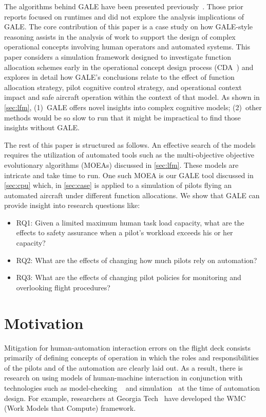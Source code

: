 \documentclass[journal]{IEEEtran}
\newcommand{\tion}[1]{\textsection\ref{sec:#1}}
\begin{document}
The algorithms behind GALE have been presented previously~\cite{krall14aaai,krallphd,galepaper}.
 Those prior reports  focused on runtimes and did not explore the analysis implications of GALE.
The core contribution of this paper is a case study on how GALE-style reasoning assists 
in the analysis of
work to support the design of complex operational concepts involving human operators and automated systems. This paper considers a simulation framework designed to investigate function allocation schemes early in the operational concept design process (CDA~\cite{Kim2011,Pritchett2011,Feigh2012,Kim2013,Pritchett2013}) 
and explores in detail how GALE’s conclusions relate to the effect of function allocation strategy, pilot cognitive control strategy, and operational context impact and safe aircraft operation within the context of that model. 
As shown in \tion{lfm}, (1)~GALE offers  novel insights into complex cognitive models; (2)~other methods would be so slow to run that it might be impractical to find those insights without GALE.


The rest of this  paper is structured as follows.
An effective search of the models requires the utilization of automated tools such as the multi-objective objective evolutionary algorithms (MOEAs) discussed in \tion{lfm}.
These models are intricate and take time to run. 
One such MOEA is our GALE tool discussed in \tion{cpu} which, in \tion{case} is applied to a simulation
of pilots flying an automated aircraft under different function allocations.
We show that GALE can provide insight into research questions like:
\begin{itemize}
\item RQ1:  Given a limited maximum human task load capacity, what are the effects to safety assurance when a pilot's workload exceeds his or her capacity?
\item RQ2:  What are the effects of changing how much pilots rely on automation?
\item RQ3: What are the effects of changing pilot policies for monitoring and overlooking flight procedures? 
\end{itemize}






\section{Motivation}\label{sec:mot}


Mitigation for human-automation interaction errors on the flight deck consists primarily of defining concepts of operation in which the roles and responsibilities of the pilots and of the automation are clearly laid out.
As a result, there is research on using models of human-machine interaction in conjunction with technologies such as model-checking ~\cite{Bolton2011,Rungta2013,Gelman2014} and simulation~\cite{Kim2011,Pritchett2011,Feigh2012,Kim2013,Pritchett2014,Feigh2014} at the time of automation design. 
For example, researchers at Georgia Tech~\cite{Kim2011,Pritchett2011,Feigh2012,Kim2013,Pritchett2014,Feigh2014} have developed the WMC (Work Models that Compute) framework.  
\end{document}
